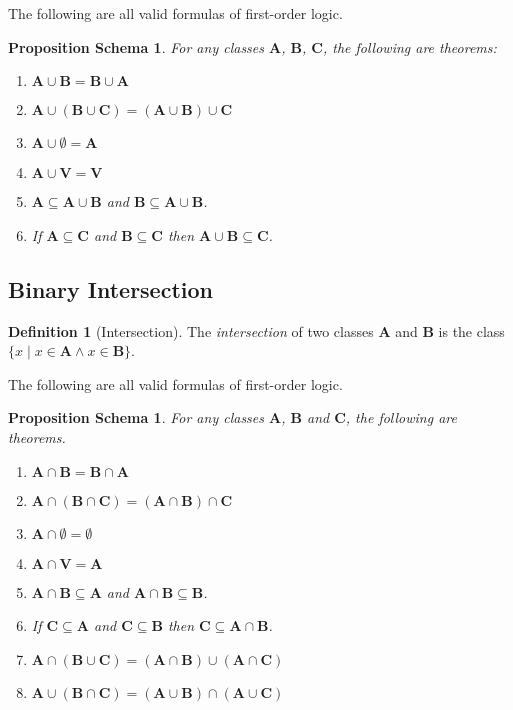\documentclass{book}
\newtheorem{props}[ax]{Proposition Schema}
\theoremstyle{definition}
\newtheorem{df}[ax]{Definition}
\begin{document}
The following are all valid formulas of first-order logic.

\begin{props}
For any classes $\mathbf{A}$, $\mathbf{B}$, $\mathbf{C}$, the following are theorems:
\begin{enumerate}
\item $\mathbf{A} \cup \mathbf{B} = \mathbf{B} \cup \mathbf{A}$
\item $\mathbf{A} \cup (\mathbf{B} \cup \mathbf{C}) = (\mathbf{A} \cup \mathbf{B}) \cup \mathbf{C}$
\item $\mathbf{A} \cup \emptyset = \mathbf{A}$
\item $\mathbf{A} \cup \mathbf{V} = \mathbf{V}$
\item $\mathbf{A} \subseteq \mathbf{A} \cup \mathbf{B}$ and $\mathbf{B} \subseteq \mathbf{A} \cup \mathbf{B}$.
\item If $\mathbf{A} \subseteq \mathbf{C}$ and $\mathbf{B} \subseteq \mathbf{C}$ then $\mathbf{A} \cup \mathbf{B} \subseteq \mathbf{C}$.
\end{enumerate}
\end{props}

\subsection{Binary Intersection}

\begin{df}[Intersection]
The \emph{intersection} of two classes $\mathbf{A}$ and $\mathbf{B}$ is the class $\{ x \mid x \in \mathbf{A} \wedge x \in \mathbf{B}\}$.
\end{df}

The following are all valid formulas of first-order logic.

\begin{props}
For any classes $\mathbf{A}$, $\mathbf{B}$ and $\mathbf{C}$, the following are theorems.
\begin{enumerate}
\item $\mathbf{A} \cap \mathbf{B} = \mathbf{B} \cap \mathbf{A}$
\item $\mathbf{A} \cap (\mathbf{B} \cap \mathbf{C}) = (\mathbf{A} \cap \mathbf{B}) \cap \mathbf{C}$
\item $\mathbf{A} \cap \emptyset = \emptyset$
\item $\mathbf{A} \cap \mathbf{V} = \mathbf{A}$
\item $\mathbf{A} \cap \mathbf{B} \subseteq \mathbf{A}$ and $\mathbf{A} \cap \mathbf{B} \subseteq \mathbf{B}$.
\item If $\mathbf{C} \subseteq \mathbf{A}$ and $\mathbf{C} \subseteq \mathbf{B}$ then $\mathbf{C} \subseteq \mathbf{A} \cap \mathbf{B}$.
\item $\mathbf{A} \cap (\mathbf{B} \cup \mathbf{C}) = (\mathbf{A} \cap \mathbf{B}) \cup (\mathbf{A} \cap \mathbf{C})$
\item $\mathbf{A} \cup (\mathbf{B} \cap \mathbf{C}) = (\mathbf{A} \cup \mathbf{B}) \cap (\mathbf{A} \cup \mathbf{C})$
\end{enumerate}
\end{props}
\end{document}
